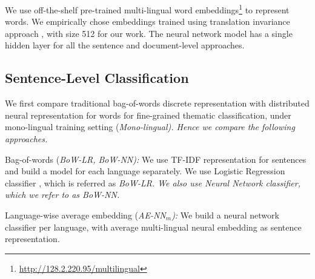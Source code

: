 \documentclass[11pt,a4paper]{article}
\newcommand{\tabref}[2][]{Table#1~\ref{#2}\xspace}
\begin{document}
We use off-the-shelf pre-trained multi-lingual word embeddings\footnote{\url{http://128.2.220.95/multilingual}} to represent words. We empirically chose embeddings trained using translation invariance approach \cite{ammar2016massively}, with size 512 for our work. The neural network model has a single hidden layer for all the sentence and document-level approaches. 
\subsection{Sentence-Level Classification}
We first compare traditional bag-of-words discrete representation with distributed neural representation for words for fine-grained thematic classification, under mono-lingual training setting (\em{Mono-lingual}). \rm Hence we compare the following approaches. 
\begin{description}
\item{Bag-of-words (\em{BoW-LR}, \em{BoW-NN}):} We use TF-IDF representation for sentences and build a model for each language separately. We use Logistic Regression classifier \cite{biessmann2016automating}, which is referred as \em{BoW-LR}. \rm We also use Neural Network classifier, which we refer to as \em{BoW-NN}. \rm

\item{Language-wise average embedding (\em{AE-NN$_{m}$}):} \rm We build a neural network classifier per language, with average multi-lingual neural embedding as sentence representation.
\end{description}

\end{document}
